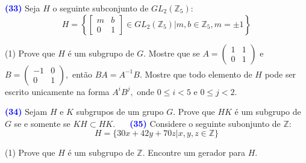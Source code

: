 \documentclass[12pt, a4paper]{article}
\newcommand{\negrito}[1]{\mbox{\boldmath{$#1$}}}
\begin{document}
\textcolor{blue}{\bf(33)}\label{ex9} Seja $H$ o seguinte subconjunto de $GL_2(\mathbb{Z}_5):$
\[
H = \left\{ \left[ \begin{array}{cc} m & b \\ 0 & 1 \end{array}   \right] \in GL_2(\mathbb{Z}_5) \big|  m,b \in \mathbb{Z}_5, m = \pm 1 \right\}
\]
\begin{tasks}[counter-format={(tsk[a])},label-width=3.6ex, label-format = {\bfseries}, column-sep = {0pt}](1)
\task[\textcolor{Floresta}{$\negrito{(a)} $}] Prove que $H$ é um subgrupo de $G.$ 
\task[\textcolor{Floresta}{$\negrito{(b)} $}] Mostre que se $A = \left( \begin{array}{cc} 1 & 1 \\ 0 & 1 \end{array} \right)$ e $B = \left( \begin{array}{cc} -1 & 0 \\ 0 & 1 \end{array} \right),$ então $BA = A^{-1}B.$
\task[\textcolor{Floresta}{$\negrito{(c)} $}] Mostre que todo elemento de $H$ pode ser escrito unicamente na forma $A^iB^j,$ onde $0 \le i < 5$ e $0 \le j < 2.$ 
\end{tasks}
\textcolor{blue}{\bf(34)}\label{ex10} Sejam $H$ e $K$ subgrupos de um grupo $G.$ Prove que $HK$ é um subgrupo de $G$ se e somente se $KH \subset HK.$
\textcolor{white}{Oi}\newline\newline
\textcolor{blue}{\bf(35)}\label{ex11} Considere o seguinte subonjunto de $\mathbb{Z}:$
\[
H = \{ 30x + 42y + 70z | x,y,z \in \mathbb{Z} \}
\]
\begin{tasks}[counter-format={(tsk[a])},label-width=3.6ex, label-format = {\bfseries}, column-sep = {0pt}](1)
\task[\textcolor{Floresta}{$\negrito{(a)} $}] Prove que $H$ é um subgrupo de $\mathbb{Z}.$
\task[\textcolor{Floresta}{$\negrito{(b)} $}] Encontre um gerador para $H.$
\end{tasks}
\newpage
\end{document}
